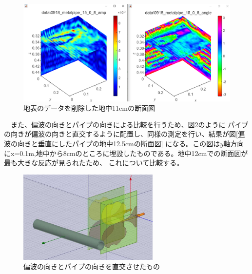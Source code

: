 \documentclass[12pt,a4paper]{jsreport}
\begin{document}
      \begin{figure}[h]
        \begin{center}
         \includegraphics[width=14cm]{dataimage/matlab/0918_metalpipe_(15,0,8)_xdirection_d=34cm_delete_unnecessary.png}
        \caption{地表のデータを削除した地中11cmの断面図}\label{地表のデータを削除した地中11cmの断面図}
        \end{center}
        \end{figure}

\clearpage
　また、偏波の向きとパイプの向きによる比較を行うため、図\ref{偏波の向きとパイプの向きを直交させたもの}のように
パイプの向きが偏波の向きと直交するように配置し、同様の測定を行い、結果が図\ref{偏波の向きと垂直にしたパイプの地中12.5cmの断面図}
になる。この図は$y$軸方向にx=0.1m,地中から8cmのところに埋設したものである。地中12cmでの断面図が最も大きな反応が見られたため、
これについて比較する。

        \begin{figure}[h]
          \begin{center}
           \includegraphics[width=7cm]{image/vertical_and_horizontal.png}
          \caption{偏波の向きとパイプの向きを直交させたもの}\label{偏波の向きとパイプの向きを直交させたもの}
          \end{center}
          \end{figure}
           
\end{document}
